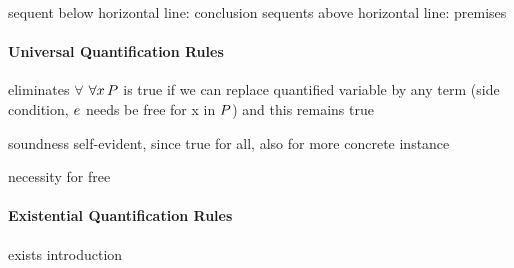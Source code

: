 
                sequent below horizontal line: conclusion
                sequents above horizontal line: premises

                \paragraph{Universal Quantification Rules}
                    eliminates $\forall$
                    $\forall x{\,} P$ is true if we can replace quantified variable by any term (side condition, $e$ needs be free for x in $P$) and this remains true

                    \begin{calculus}
                    \end{calculus}

                    soundness self-evident, since true for all, also for more concrete instance

                    \begin{example}
                        necessity for free

                    \end{example}

                \paragraph{Existential Quantification Rules}
                    exists introduction

                    \begin{calculus}
                    \end{calculus}

